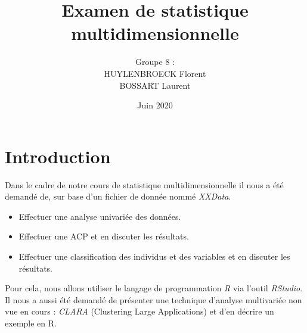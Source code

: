 \documentclass[11pt]{article}
\title{\huge Examen de statistique multidimensionnelle}
\author{Groupe 8 :\\
HUYLENBROECK Florent\\
BOSSART Laurent}
\date{Juin 2020}
\begin{document}
\maketitle
\newpage
\tableofcontents
\newpage
\section{Introduction}
Dans le cadre de notre cours de statistique multidimensionnelle il nous a été demandé de, sur base d'un fichier de donnée nommé \emph{XXData}.
\begin{itemize}
\item Effectuer une analyse univariée des données.
\item Effectuer une ACP et en discuter les résultats.
\item Effectuer une classification des individus et des variables et en discuter les résultats.
\end{itemize}
Pour cela, nous allons utiliser le langage de programmation \emph{R} via l'outil \emph{RStudio}.\\
Il nous a aussi été demandé de présenter une technique d'analyse multivariée non vue en cours : \emph{CLARA} (Clustering Large Applications) et d'en décrire un exemple en R.
\end{document}
